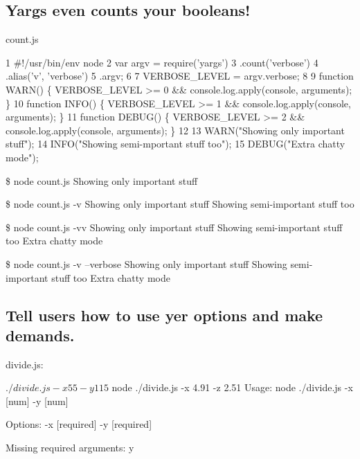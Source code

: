 \subsection*{Yargs even counts your booleans! }

count.\+js


\begin{DoxyCode}
1 #!/usr/bin/env node
2 var argv = require('yargs')
3     .count('verbose')
4     .alias('v', 'verbose')
5     .argv;
6 
7 VERBOSE\_LEVEL = argv.verbose;
8 
9 function WARN()  \{ VERBOSE\_LEVEL >= 0 && console.log.apply(console, arguments); \}
10 function INFO()  \{ VERBOSE\_LEVEL >= 1 && console.log.apply(console, arguments); \}
11 function DEBUG() \{ VERBOSE\_LEVEL >= 2 && console.log.apply(console, arguments); \}
12 
13 WARN("Showing only important stuff");
14 INFO("Showing semi-mportant stuff too");
15 DEBUG("Extra chatty mode");
\end{DoxyCode}




 \$ node count.\+js Showing only important stuff

\$ node count.\+js -\/v Showing only important stuff Showing semi-\/important stuff too

\$ node count.\+js -\/vv Showing only important stuff Showing semi-\/important stuff too Extra chatty mode

\$ node count.\+js -\/v --verbose Showing only important stuff Showing semi-\/important stuff too Extra chatty mode

\subsection*{Tell users how to use yer options and make demands. }

divide.\+js\+:






 \begin{DoxyVerb}$ ./divide.js -x 55 -y 11
5

$ node ./divide.js -x 4.91 -z 2.51
Usage: node ./divide.js -x [num] -y [num]

Options:
  -x  [required]
  -y  [required]

Missing required arguments: y
\end{DoxyVerb}


